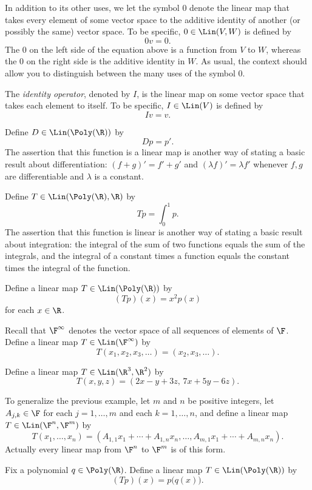 \begin{example}\label{ax:3.3}\leavevmode
\begin{axprops}
\item[zero] In addition to its other uses, we let the symbol $0$ denote the
  linear map that takes every element of some vector space to the additive
  identity of another (or possibly the same) vector space. To be specific,
  $0\in\Lin(V,W)$ is defined by
  \[ 0v=0. \]
  The $0$ on the left side of the equation above is a function from $V$ to
  $W$, whereas the $0$ on the right side is the additive identity in $W$. As
  usual, the context should allow you to distinguish between the many uses of
  the symbol $0$.
\item[identity operator] The \emph{identity operator}, denoted by $I$, is the
  linear map on some vector space that takes each element to itself. To be
  specific, $I\in\Lin(V)$ is defined by
  \[ Iv=v. \]
\item[differentiation] Define $D\in\Lin(\Poly(\R))$ by
  \[ Dp=p'. \]
  The assertion that this function is a linear map is another way of stating
  a basic result about differentiation: $(f+g)'=f'+g'$ and
  $(\lambda f)'=\lambda f'$ whenever $f,g$ are differentiable and $\lambda$ is
  a constant.
\item[integration] Define $T\in\Lin(\Poly(\R),\R)$ by
  \[ Tp=\int_0^1 p. \]
  The assertion that this function is linear is another way of stating a basic
  result about integration: the integral of the sum of two functions equals
  the sum of the integrals, and the integral of a constant times a function
  equals the constant times the integral of the function.
\item[multiplication by $x^2$] Define a linear map $T\in\Lin(\Poly(\R))$ by
  \[ (Tp)(x)=x^2p(x) \]
  for each $x\in\R$.
\item[backward shift] Recall that $\F^\infty$ denotes the vector space of all
  sequences of elements of $\F$. Define a linear map $T\in\Lin(\F^\infty)$ by
  \[ T(x_1,x_2,x_3,\dots)=(x_2,x_3,\dots). \]
\item[from $\R^3$ to $\R^2$] Define a linear map $T\in\Lin(\R^3,\R^2)$ by
  \[ T(x,y,z)=(2x-y+3z,\,7x+5y-6z). \]
\item[from $\F^n$ to $\F^m$] To generalize the previous example, let $m$ and
  $n$ be positive integers, let $A_{j,k}\in\F$ for each $j=1,\dots,m$ and each
  $k=1,\dots,n$, and define a linear map $T\in\Lin(\F^n,\F^m)$ by
  \[ T(x_1,\dots,x_n)=(A_{1,1}x_1+\cdots+A_{1,n}x_n,\dots,
     A_{m,1}x_1+\cdots+A_{m,n}x_n). \]
  Actually every linear map from $\F^n$ to $\F^m$ is of this form.
\item[composition] Fix a polynomial $q\in\Poly(\R)$. Define a linear map
  $T\in\Lin(\Poly(\R))$ by
  \[ (Tp)(x)=p\bigl(q(x)\bigr). \]
\end{axprops}
\end{example}

